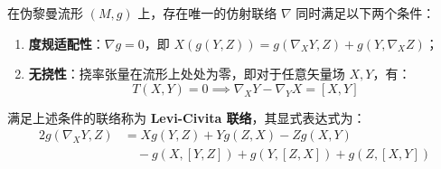 \begin{theorem}[Koszul公式]
    在伪黎曼流形 $(M, g)$ 上，存在唯一的仿射联络 $\nabla$ 同时满足以下两个条件：
    \begin{enumerate}
        \item \textbf{度规适配性}：$\nabla g = 0$，即 $X(g(Y, Z)) = g(\nabla_X Y, Z) + g(Y, \nabla_X Z)$；
        \item \textbf{无挠性}：挠率张量在流形上处处为零，即对于任意矢量场 $X, Y$，有：
        \[ T(X, Y) = 0 \implies \nabla_X Y - \nabla_Y X = [X, Y] \]
    \end{enumerate}
    
    满足上述条件的联络称为 \textbf{Levi-Civita 联络}，其显式表达式为：
    \begin{equation} \label{eq:general_koszul}
    \begin{aligned}
        2g(\nabla_X Y, Z) &= X g(Y, Z) + Y g(Z, X) - Z g(X, Y) \\
        &\quad - g(X, [Y, Z]) + g(Y, [Z, X]) + g(Z, [X, Y])
    \end{aligned}
    \end{equation}
\end{theorem}

